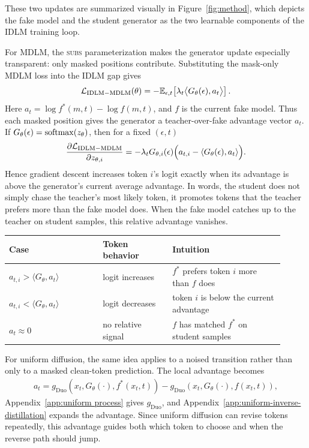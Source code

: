     These two updates are summarized visually in Figure~\ref{fig:method},
    which depicts the fake model and the student generator as the two
    learnable components of the IDLM training loop.

    For MDLM, the \textsc{subs} parameterization makes the generator update
    especially transparent: only masked positions contribute. Substituting the
    mask-only MDLM loss into the IDLM gap gives
    \[
    \mathcal{L}_{\mathrm{IDLM-MDLM}}(\theta)
    =
    -\mathbb{E}_{\epsilon,t}\!
    \left[
    \lambda_t\big\langle G_\theta(\epsilon),a_t\big\rangle
    \right].
    \]
    Here \(a_t=\log f^*(m,t)-\log f(m,t)\), and \(f\) is the current fake model. Thus
    each masked position gives the
    generator a teacher-over-fake advantage vector \(a_t\). If
    \(G_\theta(\epsilon)=\mathrm{softmax}(z_\theta)\), then for a fixed \((\epsilon,t)\)
    \[
    \frac{\partial \mathcal{L}_{\mathrm{IDLM-MDLM}}}{\partial z_{\theta,i}}
    =
    -\lambda_t G_{\theta,i}(\epsilon)
    \Big(a_{t,i}-\langle G_\theta(\epsilon),a_t\rangle\Big).
    \]
    Hence gradient descent increases token \(i\)'s logit exactly when its advantage
    is above the generator's current average advantage. In words, the student does
    not simply chase the teacher's most likely token, it promotes tokens that the
    teacher prefers more than the fake model does. When the fake model catches up
    to the teacher on student samples, this relative advantage vanishes.

    \begin{center}
    {\small
    \setlength{\tabcolsep}{2.5pt}
    \begin{tabular}{@{}>{\raggedright\arraybackslash}p{0.31\linewidth}>{\raggedright\arraybackslash}p{0.23\linewidth}>{\raggedright\arraybackslash}p{0.37\linewidth}@{}}
    \toprule
    Case & Token behavior & Intuition \\
    \midrule
    \(a_{t,i}>\langle G_\theta,a_t\rangle\)
    & logit increases
    & $f^*$ prefers token \(i\) more than $f$ does \\
    \(a_{t,i}<\langle G_\theta,a_t\rangle\)
    & logit decreases
    & token \(i\) is below the current advantage \\
    \(a_t\approx 0\)
    & no relative signal
    & $f$ has matched $f^*$ on student samples \\
    \bottomrule
    \end{tabular}
    }
    \end{center}

    For uniform diffusion, the same idea applies to a noised transition rather
    than only to a masked clean-token prediction. The local advantage becomes
    \[
    \begin{aligned}
    a_t
    =
    g_{\mathrm{Duo}}(x_t,G_{\theta}(\cdot),f^*(x_t,t))-
    g_{\mathrm{Duo}}(x_t,G_{\theta}(\cdot),f(x_t,t)),
    \end{aligned}
    \]
    Appendix~\ref{app:uniform process} gives \(g_{\mathrm{Duo}}\), and Appendix~\ref{app:uniform-inverse-distillation} expands the advantage.
    Since uniform diffusion can revise tokens repeatedly, this advantage guides
    both which token to choose and when the reverse path should jump.


